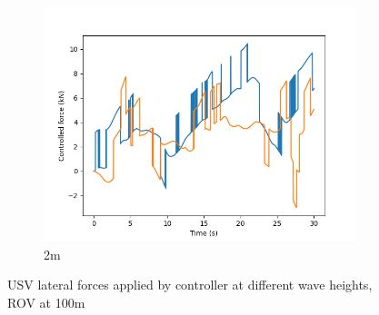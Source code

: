 \documentclass[class=article, crop=false]{standalone}
\begin{document}
\begin{figure}
\begin{subfigure}[b]{0.48\textwidth}
        \includegraphics{scenario1/rov-100m/2.0m/usv_forces}
        \caption{2m}
        \label{}
    \end{subfigure}

    \caption{USV lateral forces applied by controller at different wave heights, ROV at 100m}
\end{figure}
\end{document}
